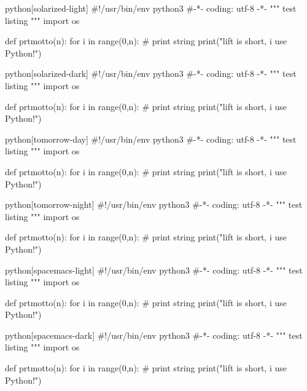 \documentclass[utf8,a4paper,11pt]{article}
\begin{document}
\begin{sourcecode}{python}[solarized-light]
#!/usr/bin/env python3
#-*- coding: utf-8 -*-
"""
test listing
"""
import os

def prtmotto(n):
    for i in range(0,n):
        # print string
        print("lift is short, i use Python!")
\end{sourcecode}

\vspace{6em}

\begin{sourcecode}{python}[solarized-dark]
#!/usr/bin/env python3
#-*- coding: utf-8 -*-
"""
test listing
"""
import os

def prtmotto(n):
    for i in range(0,n):
        # print string
        print("lift is short, i use Python!")
\end{sourcecode}

\newpage

\begin{sourcecode}{python}[tomorrow-day]
#!/usr/bin/env python3
#-*- coding: utf-8 -*-
"""
test listing
"""
import os

def prtmotto(n):
    for i in range(0,n):
        # print string
        print("lift is short, i use Python!")
\end{sourcecode}

\vspace{6em}

\begin{sourcecode}{python}[tomorrow-night]
#!/usr/bin/env python3
#-*- coding: utf-8 -*-
"""
test listing
"""
import os

def prtmotto(n):
    for i in range(0,n):
        # print string
        print("lift is short, i use Python!")
\end{sourcecode}

\newpage

\begin{sourcecode}{python}[spacemacs-light]
#!/usr/bin/env python3
#-*- coding: utf-8 -*-
"""
test listing
"""
import os

def prtmotto(n):
    for i in range(0,n):
        # print string
        print("lift is short, i use Python!")
\end{sourcecode}

\vspace{6em}

\begin{sourcecode}{python}[spacemacs-dark]
#!/usr/bin/env python3
#-*- coding: utf-8 -*-
"""
test listing
"""
import os

def prtmotto(n):
    for i in range(0,n):
        # print string
        print("lift is short, i use Python!")
\end{sourcecode}
\end{document}
